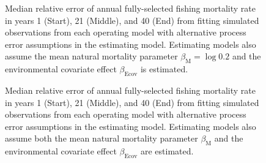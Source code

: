 \documentclass[
  12pt,
]{article}
\begin{document}
\begin{landscape}
\begin{figure}
\caption{Median relative error of annual fully-selected fishing mortality rate in years 1 (Start), 21 (Middle), and 40 (End) from fitting simulated observations from each operating model with alternative process error assumptions in the estimating model. Estimating models also assume the mean natural mortality parameter $\beta_\text{M} = \log 0.2$ and the environmental covariate effect $\beta_\text{Ecov}$ is estimated.}\label{F_bias_M_fixed_beta_estimated}
\begin{center}
\end{center}
\end{figure}
\end{landscape}

\begin{landscape}
\begin{figure}
\caption{Median relative error of annual fully-selected fishing mortality rate in years 1 (Start), 21 (Middle), and 40 (End) from fitting simulated observations from each operating model with alternative process error assumptions in the estimating model. Estimating models also assume both the mean natural mortality parameter $\beta_\text{M}$ and the environmental covariate effect $\beta_\text{Ecov}$ are estimated.}\label{F_bias_M_estimated_beta_estimated}
\begin{center}
\end{center}
\end{figure}
\end{landscape}
\end{document}
